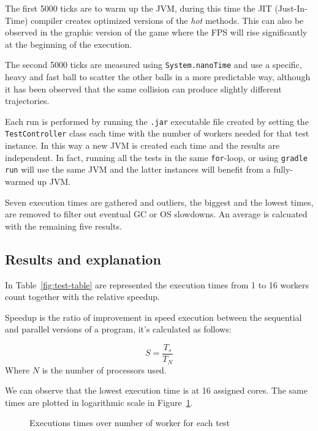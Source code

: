 \documentclass{scrartcl}
\begin{document}
The first \num{5000} ticks are to warm up the JVM, during this time the JIT (Just-In-Time) compiler
creates optimized versions of the \textit{hot} methods. This can also be observed in the graphic version
of the game where the FPS will rise significantly at the beginning of the execution.

The second \num{5000} ticks are measured using \texttt{System.nanoTime} and use a specific, heavy and fast
ball to scatter the other balls in a more predictable way, although it has been observed that the same collision
can produce slightly different trajectories.

Each run is performed by running the \texttt{.jar} executable file created by setting
the \texttt{TestController} class each time with the number of workers needed for that 
test instance. In this way a new JVM is created each time and the results are independent.
In fact, running all the tests in the same \texttt{for}-loop, or using \texttt{gradle run}
will use the same JVM and the latter instances will benefit from a fully-warmed up JVM.

Seven execution times are gathered and outliers, the biggest and the lowest times, are removed
to filter out eventual GC or OS slowdowns. An average is calcuated with the remaining five results.

\subsection{Results and explanation}
In Table~\ref{fig:test-table} are represented the execution times from 1 to 16 workers count together with the
relative speedup.

\begin{table}[H]
    
    \caption{Execution times varying the workers' count}\label{fig:test-table}
\end{table}

Speedup is the ratio of improvement in speed execution between the sequential and parallel versions of a program,
it's calculated as follows:

\[
    S = \frac{T_s}{T_N}
\]
Where $N$ is the number of processors used.

We can observe that the lowest execution time is at 16 assigned cores.
The same times are plotted in logarithmic scale in Figure~\ref{fig:test-plot}.
\begin{figure}[H]
    
    \centering
    \caption{Executions times over number of worker for each test}\label{fig:test-plot}
\end{figure}
\end{document}
